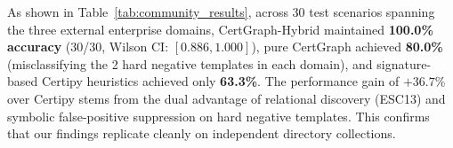 As shown in Table~\ref{tab:community_results}, across 30 test scenarios spanning the three external enterprise domains, CertGraph-Hybrid maintained \textbf{100.0\% accuracy} (30/30, Wilson CI: $[0.886, 1.000]$), pure CertGraph achieved \textbf{80.0\%} (misclassifying the 2 hard negative templates in each domain), and signature-based Certipy heuristics achieved only \textbf{63.3\%}. The performance gain of $+36.7\%$ over Certipy stems from the dual advantage of relational discovery (ESC13) and symbolic false-positive suppression on hard negative templates. This confirms that our findings replicate cleanly on independent directory collections.
